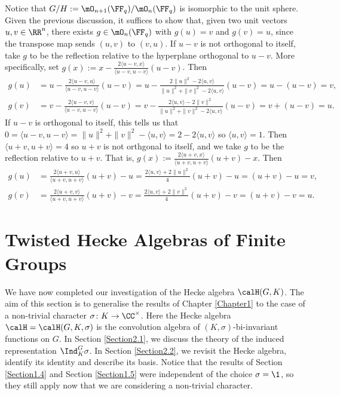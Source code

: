 \documentclass[11pt]{amsart}
\theoremstyle{remark}
\begin{document}
Notice that $G/H := \mO_{n+1}(\FF_q)/\mO_n(\FF_q)$ is isomorphic to the unit sphere.
Given the previous discussion, it suffices to show that, given two unit vectors $u,v\in\RR^n$, there exists $g\in\mO_n(\FF_q)$ with $g(u) = v$ and $g(v) = u$, since the transpose map sends $(u,v)$ to $(v,u)$.
If $u-v$ is not orthogonal to itself, take $g$ to be the reflection relative to the hyperplane orthogonal to $u-v$.
More specifically, set $g(x) := x - \frac{2\langle u-v,x\rangle}{\langle u-v,u-v\rangle}(u-v)$.
Then
\begin{align*}
	g(u) & = u - \frac{2\langle u-v,u\rangle}{\langle u-v,u-v\rangle}(u-v) = u - \frac{2\|u\|^2-2\langle u,v\rangle}{\|u\|^2+\|v\|^2-2\langle u,v\rangle}(u-v) = u - (u-v) = v, \\
	g(v) & = v - \frac{2\langle u-v,v\rangle}{\langle u-v,u-v\rangle}(u-v) = v - \frac{2\langle u,v\rangle-2\|v\|^2}{\|u\|^2+\|v\|^2-2\langle u,v\rangle}(u-v) = v + (u-v) = u.
\end{align*}
If $u-v$ is orthogonal to itself, this tells us that $0=\langle u-v,u-v\rangle = \|u\|^2+\|v\|^2-\langle u,v\rangle = 2-2\langle u,v\rangle$ so $\langle u,v\rangle = 1$.
Then $\langle u+v,u+v\rangle = 4$ so $u+v$ is not orthgonal to itself, and we take $g$ to be the reflection relative to $u+v$.
That is, $g(x) := \frac{2\langle u+v,x\rangle}{\langle u+v,u+v\rangle}(u+v) - x$.
Then
\begin{align*}
	g(u) & = \frac{2\langle u+v,u\rangle}{\langle u+v,u+v\rangle}(u+v) - u = \frac{2\langle u,v\rangle + 2\|u\|^2}{4}(u+v)-u = (u+v)-u = v, \\
	g(v) & = \frac{2\langle u+v,v\rangle}{\langle u+v,u+v\rangle}(u+v) - v = \frac{2\langle u,v\rangle + 2\|v\|^2}{4}(u+v)-v = (u+v)-v = u.
\end{align*}


\newpage
\section{Twisted Hecke Algebras of Finite Groups}\label{Chapter2}
We have now completed our investigation of the Hecke algebra $\calH(G,K)$.
The aim of this section is to generalise the results of Chapter \ref{Chapter1} to the case of a non-trivial character $\sigma\colon K\to\CC^\times$.
Here the Hecke algebra $\calH=\calH(G,K,\sigma)$ is the convolution algebra of $(K,\sigma)$-bi-invariant functions on $G$.
In Section \ref{Section2.1}, we discuss the theory of the induced representation $\Ind_K^G \sigma$.
In Section \ref{Section2.2}, we revisit the Hecke algebra, identify its identity and describe its basis.
Notice that the results of Section \ref{Section1.4} and Section \ref{Section1.5} were independent of the choice $\sigma=\1$, so they still apply now that we are considering a non-trivial character.
\end{document}
